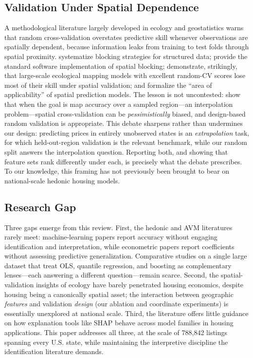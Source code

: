 \subsection{Validation Under Spatial Dependence}

A methodological literature largely developed in ecology and geostatistics warns
that random cross-validation overstates predictive skill whenever observations are
spatially dependent, because information leaks from training to test folds through
spatial proximity. \citet{roberts2017cross} systematize blocking strategies for
structured data; \citet{valavi2019blockcv} provide the standard software
implementation of spatial blocking; \citet{ploton2020spatial} demonstrate,
strikingly, that large-scale ecological mapping models with excellent random-CV
scores lose most of their skill under spatial validation; and
\citet{meyer2021predicting} formalize the ``area of applicability'' of spatial
prediction models. The lesson is not uncontested: \citet{wadoux2021spatial} show
that when the goal is map accuracy over a sampled region---an interpolation
problem---spatial cross-validation can be \emph{pessimistically} biased, and
design-based random validation is appropriate. This debate sharpens rather than
undermines our design: predicting prices in entirely unobserved states is an
\emph{extrapolation} task, for which held-out-region validation is the relevant
benchmark, while our random split answers the interpolation question. Reporting
both, and showing that feature sets rank differently under each, is precisely what
the debate prescribes. To our knowledge, this framing has not previously been
brought to bear on national-scale hedonic housing models.

\subsection{Research Gap}

Three gaps emerge from this review. First, the hedonic and AVM literatures rarely
meet: machine-learning papers report accuracy without engaging identification and
interpretation, while econometric papers report coefficients without assessing
predictive generalization. Comparative studies on a single large dataset that treat
OLS, quantile regression, and boosting as complementary lenses---each answering a
different question---remain scarce. Second, the spatial-validation insights of
ecology have barely penetrated housing economics, despite housing being a
canonically spatial asset; the interaction between geographic \emph{features} and
validation \emph{design} (our ablation and coordinate experiments) is essentially
unexplored at national scale. Third, the literature offers little guidance on how
explanation tools like SHAP behave across model families in housing applications.
This paper addresses all three, at the scale of 788,842 listings spanning every
U.S. state, while maintaining the interpretive discipline the identification
literature demands.
